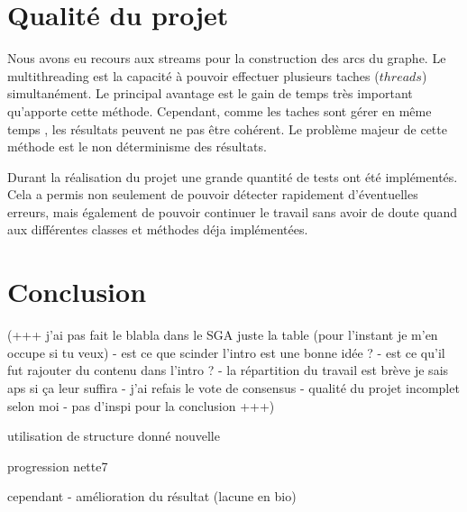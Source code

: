 \documentclass{article}
\begin{document}
\section{Qualité du projet}

Nous avons eu recours aux streams pour la construction des arcs du graphe. Le multithreading est la capacité à pouvoir effectuer plusieurs taches ($threads$) simultanément. Le principal avantage est le gain de temps très important qu'apporte cette méthode. Cependant, comme les taches sont gérer en même temps , les résultats peuvent ne pas être cohérent. Le problème majeur de cette méthode est le non déterminisme des résultats.

Durant la réalisation du projet une grande quantité de tests ont été implémentés. Cela a permis non seulement de pouvoir détecter rapidement d'éventuelles erreurs, mais également de pouvoir continuer le travail sans avoir de doute quand aux différentes classes et méthodes déja implémentées.



\section{Conclusion}

(+++ j'ai pas fait le blabla dans le SGA juste la table (pour l'instant je m'en occupe si tu veux)  - est ce que scinder l'intro est une bonne idée ? - est ce qu'il fut rajouter du contenu dans l'intro ? -  la répartition du travail est brève je sais aps si ça leur suffira -  j'ai refais le vote de consensus -  qualité du projet incomplet selon moi - pas d'inspi pour la conclusion +++)

utilisation de structure donné nouvelle

progression nette7

cependant - amélioration du résultat (lacune en bio)
\end{document}
